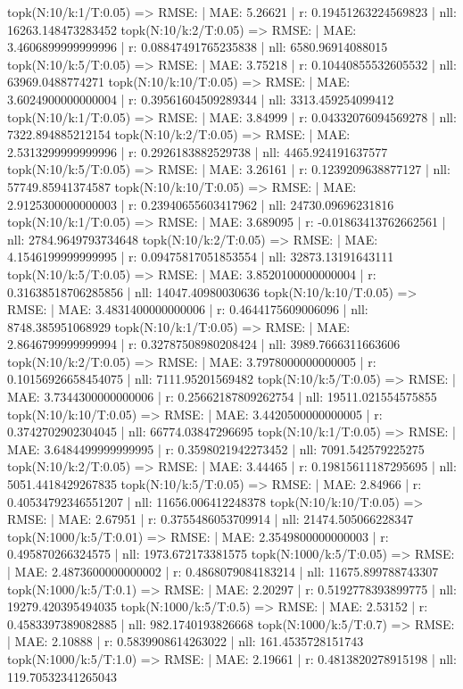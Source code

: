 topk(N:10/k:1/T:0.05) => RMSE: | MAE: 5.26621 | r: 0.19451263224569823 | nll: 16263.148473283452
topk(N:10/k:2/T:0.05) => RMSE: | MAE: 3.4606899999999996 | r: 0.08847491765235838 | nll: 6580.96914088015
topk(N:10/k:5/T:0.05) => RMSE: | MAE: 3.75218 | r: 0.10440855532605532 | nll: 63969.0488774271
topk(N:10/k:10/T:0.05) => RMSE: | MAE: 3.6024900000000004 | r: 0.39561604509289344 | nll: 3313.459254099412
topk(N:10/k:1/T:0.05) => RMSE: | MAE: 3.84999 | r: 0.04332076094569278 | nll: 7322.894885212154
topk(N:10/k:2/T:0.05) => RMSE: | MAE: 2.5313299999999996 | r: 0.2926183882529738 | nll: 4465.924191637577
topk(N:10/k:5/T:0.05) => RMSE: | MAE: 3.26161 | r: 0.1239209638877127 | nll: 57749.85941374587
topk(N:10/k:10/T:0.05) => RMSE: | MAE: 2.9125300000000003 | r: 0.23940655603417962 | nll: 24730.09696231816
topk(N:10/k:1/T:0.05) => RMSE: | MAE: 3.689095 | r: -0.01863413762662561 | nll: 2784.9649793734648
topk(N:10/k:2/T:0.05) => RMSE: | MAE: 4.1546199999999995 | r: 0.09475817051853554 | nll: 32873.13191643111
topk(N:10/k:5/T:0.05) => RMSE: | MAE: 3.8520100000000004 | r: 0.31638518706285856 | nll: 14047.40980030636
topk(N:10/k:10/T:0.05) => RMSE: | MAE: 3.4831400000000006 | r: 0.4644175609006096 | nll: 8748.385951068929
topk(N:10/k:1/T:0.05) => RMSE: | MAE: 2.8646799999999994 | r: 0.32787508980208424 | nll: 3989.7666311663606
topk(N:10/k:2/T:0.05) => RMSE: | MAE: 3.7978000000000005 | r: 0.10156926658454075 | nll: 7111.95201569482
topk(N:10/k:5/T:0.05) => RMSE: | MAE: 3.7344300000000006 | r: 0.25662187809262754 | nll: 19511.021554575855
topk(N:10/k:10/T:0.05) => RMSE: | MAE: 3.4420500000000005 | r: 0.3742702902304045 | nll: 66774.03847296695
topk(N:10/k:1/T:0.05) => RMSE: | MAE: 3.6484499999999995 | r: 0.3598021942273452 | nll: 7091.542579225275
topk(N:10/k:2/T:0.05) => RMSE: | MAE: 3.44465 | r: 0.19815611187295695 | nll: 5051.4418429267835
topk(N:10/k:5/T:0.05) => RMSE: | MAE: 2.84966 | r: 0.40534792346551207 | nll: 11656.006412248378
topk(N:10/k:10/T:0.05) => RMSE: | MAE: 2.67951 | r: 0.3755486053709914 | nll: 21474.505066228347
topk(N:1000/k:5/T:0.01) => RMSE: | MAE: 2.3549800000000003 | r: 0.495870266324575 | nll: 1973.672173381575
topk(N:1000/k:5/T:0.05) => RMSE: | MAE: 2.4873600000000002 | r: 0.4868079084183214 | nll: 11675.899788743307
topk(N:1000/k:5/T:0.1) => RMSE: | MAE: 2.20297 | r: 0.5192778393899775 | nll: 19279.420395494035
topk(N:1000/k:5/T:0.5) => RMSE: | MAE: 2.53152 | r: 0.4583397389082885 | nll: 982.1740193826668
topk(N:1000/k:5/T:0.7) => RMSE: | MAE: 2.10888 | r: 0.5839908614263022 | nll: 161.4535728151743
topk(N:1000/k:5/T:1.0) => RMSE: | MAE: 2.19661 | r: 0.4813820278915198 | nll: 119.70532341265043
